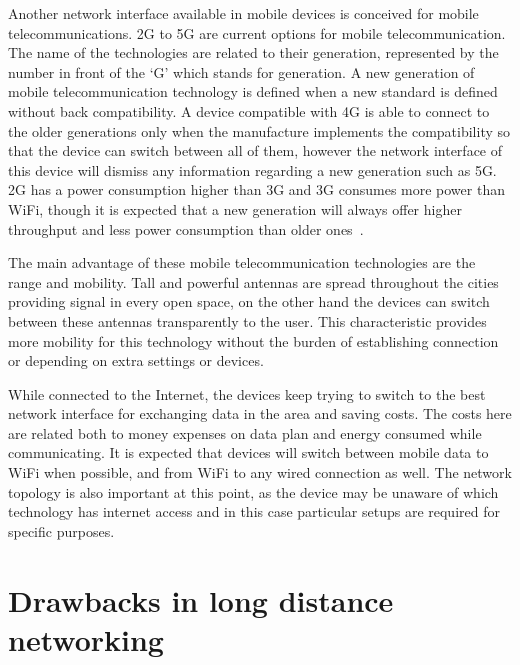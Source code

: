Another network interface available in mobile devices is conceived for mobile telecommunications.
2G to 5G are current options for mobile telecommunication.
The name of the technologies are related to their generation, represented by the number in front of the `G' which stands for generation.
A new generation of mobile telecommunication technology is defined when a new standard is defined without back compatibility.
A device compatible with 4G is able to connect to the older generations only when the manufacture implements the compatibility so that the device can switch between all of them, however the network interface of this device will dismiss any information regarding a new generation such as 5G.
2G has a power consumption higher than 3G and 3G consumes more power than WiFi, though it is expected that a new generation will always offer higher throughput and less power consumption than older ones~\citep{Rice2010decomposing,Balasubramanian2009energy}.

The main advantage of these mobile telecommunication technologies are the range and mobility.
Tall and powerful antennas are spread throughout the cities providing signal in every open space, on the other hand the devices can switch between these antennas transparently to the user.
This characteristic provides more mobility for this technology without the burden of establishing connection or depending on extra settings or devices.

While connected to the Internet, the devices keep trying to switch to the best network interface for exchanging data in the area and saving costs.
The costs here are related both to money expenses on data plan and energy consumed while communicating.
It is expected that devices will switch between mobile data to WiFi when possible, and from WiFi to any wired connection as well.
The network topology is also important at this point, as the device may be unaware of which technology has internet access and in this case particular setups are required for specific purposes.

\section{Drawbacks in long distance networking}

